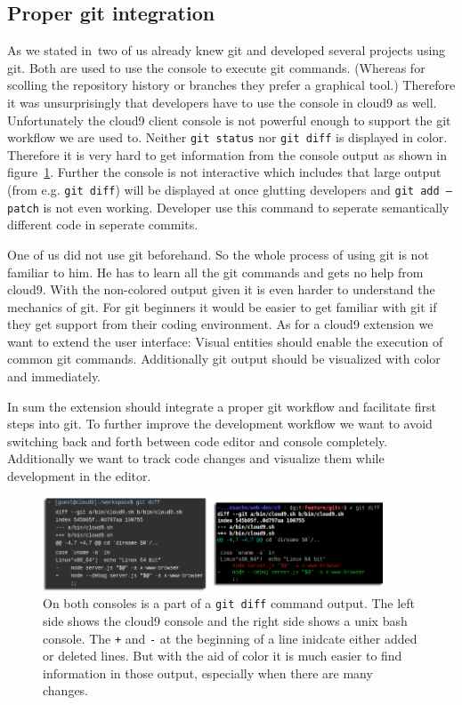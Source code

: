 \subsection{Proper git integration}
As we stated in~ two of us already knew git and developed several projects using git.
Both are used to use the console to execute git commands.
(Whereas for scolling the repository history or branches they prefer a graphical tool.)
Therefore it was unsurprisingly that developers have to use the console in cloud9 as well.
Unfortunately the cloud9 client console is not powerful enough to support the git workflow we are used to.
Neither \texttt{git status} nor \texttt{git diff} is displayed in color.
Therefore it is very hard to get information from the console output as shown in figure~\ref{fig:diff_output}.
Further the console is not interactive which includes that large output (from e.g. \texttt{git diff}) will be displayed at once glutting developers and \texttt{git add --patch} is not even working.
Developer use this command to seperate semantically different code in seperate commits.

One of us did not use git beforehand.
So the whole process of using git is not familiar to him.
He has to learn all the git commands and gets no help from cloud9.
With the non-colored output given it is even harder to understand the mechanics of git.
For git beginners it would be easier to get familiar with git if they get support from their coding environment.
As for a cloud9 extension we want to extend the user interface: 
Visual entities should enable the execution of common git commands.
Additionally git output should be visualized with color and immediately.

In sum the extension should integrate a proper git workflow and facilitate first steps into git.
To further improve the development workflow we want to avoid switching back and forth between code editor and console completely.
Additionally we want to track code changes and visualize them while development in the editor.

\begin{figure}
   \centering
   \includegraphics[width=0.9\textwidth]{images/diff_output.png}
   \caption{On both consoles is a part of a \texttt{git diff} command output.
   The left side shows the cloud9 console and the right side shows a unix bash console.
   The \texttt{+} and \texttt{-} at the beginning of a line inidcate either added or deleted lines.
   But with the aid of color it is much easier to find information in those output, especially when there are many changes.}
   \label{fig:diff_output}
\end{figure}


